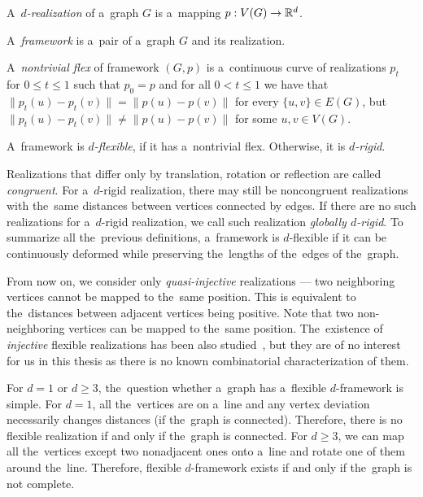 %
\begin{definition}[\( d \)-realization]
	A~\emph{\( d \)-realization} of a~graph \( G \) is a~mapping \( p: V(G) \to \mathbb{R}^d \).
\end{definition}
%
\begin{definition}[Framework]
	A~\emph{framework} is a~pair of a~graph \( G \) and its realization.
\end{definition}
%
\begin{definition}
	A~\emph{nontrivial flex} of framework \( (G, p) \) is a~continuous curve of realizations \( p_t \)
	for \( 0 \le t \le 1\) such that
	\( p_0 = p \) and for all \( 0 < t \le 1 \)
	we have that
	\( \|p_t(u) - p_t(v)\| = \|p(u) - p(v)\|\) for every \( \{u, v\} \in E(G) \),
	but \( \|p_t(u) - p_t(v)\| \ne \|p(u) - p(v)\| \) for some \( u, v \in V (G) \).
\end{definition}
%
\begin{definition}
	A~framework is \emph{\( d \)-flexible}, if it has a~nontrivial flex.
	Otherwise, it is \emph{\( d \)-rigid}.
\end{definition}
%
Realizations that differ only by translation,
rotation or reflection are called \emph{congruent}.
%
For a~\( d \)-rigid realization, there may still be noncongruent realizations
with the~same distances between vertices connected by edges.
%
If there are no such realizations for a~\( d \)-rigid realization,
we call such realization \emph{globally \( d \)-rigid}.
To summarize all the~previous definitions,
a~framework is \( d \)-flexible if it can be continuously deformed
while preserving the~lengths of the~edges of the~graph.

From now on, we consider only \emph{quasi-injective} realizations ---
two neighboring vertices cannot be mapped to the~same position.
This is equivalent to the~distances between adjacent vertices being positive.
Note that two non-neighboring vertices can be mapped to the~same position.
The~existence of \emph{injective} flexible realizations
has been also studied~\cite{injective_realizations},
but they are of no interest for us in this thesis
as there is no known combinatorial characterization of them.

For \( d = 1 \) or \( d \ge 3 \),
the~question whether a~graph has a~flexible \( d \)-framework is simple.
%
For \( d = 1 \), all the~vertices are on a~line
and any vertex deviation necessarily changes distances (if the~graph is connected).
Therefore, there is no flexible realization if and only if the~graph is connected.
%
For \( d \ge 3 \), we can map all the~vertices except two nonadjacent ones
onto a~line and rotate one of them around the~line.
Therefore, flexible \( d \)-framework exists if and only if the~graph is not complete.

